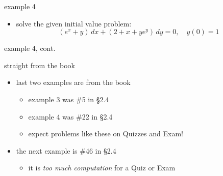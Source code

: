 \documentclass{beamer}
\begin{document}
\begin{frame}{example 4}

\begin{itemize}
\item solve the given initial value problem:
    $$(e^x+y)\,dx + (2+x+ye^y)\,dy = 0, \quad y(0)=1$$
\end{itemize}

\vspace{60mm}
\end{frame}


\begin{frame}{example 4, cont.}

\end{frame}


\begin{frame}{straight from the book}

\begin{itemize}
\item last two examples are from the book
    \begin{itemize}
    \item example 3 was \#5 in \S 2.4
    \item example 4 was \#22 in \S 2.4
    \item expect problems like these on Quizzes and Exam!
    \end{itemize}

\bigskip \bigskip
\item the next example is \#46 in \S 2.4
    \begin{itemize}
    \item it is \emph{too much computation} for a Quiz or Exam
    \end{itemize}
\end{itemize}
\end{frame}
\end{document}
